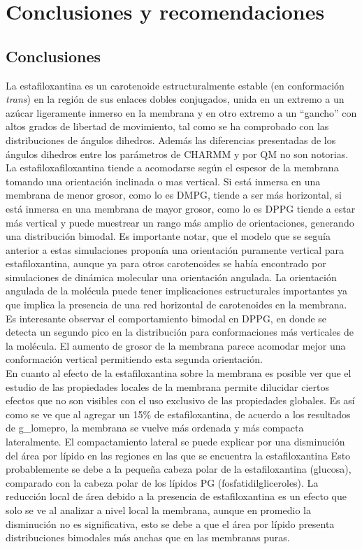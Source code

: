 \chapter{Conclusiones y recomendaciones}
\section{Conclusiones}
La estafiloxantina es un carotenoide estructuralmente estable (en conformaci\'{o}n  \textit{trans}) en la regi\'{o}n de sus enlaces dobles conjugados, unida en un extremo a un az\'{u}car ligeramente inmerso en la membrana y en otro extremo a un ``gancho'' con altos grados de libertad de movimiento, tal como se ha comprobado con las  distribuciones de \'{a}ngulos dihedros. Adem\'{a}s las diferencias presentadas de los \'{a}ngulos dihedros entre los par\'{a}metros de CHARMM y por QM no son notorias. La estafiloxafiloxantina tiende a acomodarse seg\'{u}n el espesor de la membrana tomando una orientaci\'{o}n inclinada o mas vertical. Si est\'{a} inmersa en una membrana de menor grosor, como lo es DMPG, tiende a ser m\'{a}s horizontal, si est\'{a} inmersa en una membrana de mayor grosor, como lo es DPPG tiende a estar m\'{a}s vertical y puede muestrear un rango m\'{a}s amplio de orientaciones, generando una distribuci\'{o}n bimodal. Es importante notar, que el modelo que se segu\'{i}a anterior a estas simulaciones propon\'{i}a una orientaci\'{o}n puramente vertical para estafiloxantina, aunque ya para otros carotenoides se hab\'{i}a encontrado por simulaciones de din\'{a}mica molecular una orientaci\'{o}n angulada. La orientaci\'{o}n angulada de la mol\'{e}cula puede tener implicaciones estructurales importantes ya que implica la presencia de una red horizontal de carotenoides en la membrana. Es interesante observar el comportamiento bimodal en DPPG, en donde se detecta un segundo pico en la distribuci\'{o}n para conformaciones m\'{a}s verticales de la mol\'{e}cula. El aumento de grosor de la membrana parece acomodar mejor una conformaci\'{o}n vertical permitiendo esta segunda orientaci\'{o}n. \\

En cuanto al efecto de la estafiloxantina sobre la membrana es posible ver que el estudio de las propiedades locales de la membrana permite dilucidar ciertos efectos que no son visibles con el uso exclusivo de las propiedades globales. Es as\'{i} como se ve que al agregar un 15\% de estafiloxantina, de acuerdo a los resultados de g\_lomepro, la membrana se vuelve m\'{a}s ordenada y m\'{a}s compacta lateralmente. El compactamiento lateral se puede explicar por una disminuci\'{o}n del \'{a}rea por l\'{i}pido en las regiones en las que se encuentra la estafiloxantina Esto probablemente se debe a la peque\~{n}a cabeza polar de la estafiloxantina (glucosa), comparado con la cabeza polar de los l\'{i}pidos PG (fosfatidilgliceroles). La reducci\'{o}n local de \'{a}rea debido a la presencia de estafiloxantina es un efecto que solo se ve al analizar a nivel local la membrana, aunque en promedio la disminuci\'{o}n no es significativa, esto se debe a que el \'{a}rea por l\'{i}pido presenta distribuciones bimodales m\'{a}s anchas que en las membranas puras.\\

